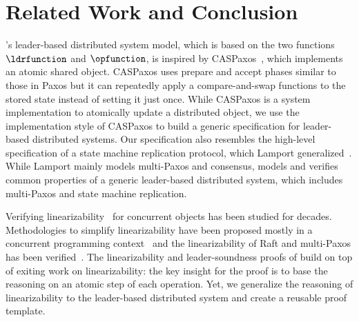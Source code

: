 \vspace{-0.7em}

\section{Related Work and Conclusion}
\label{sec:related}

\sysname{}'s leader-based distributed system model, which is based on the two functions
$\ldrfunction$ and $\opfunction$, is inspired by CASPaxos~\cite{caspaxos},
which implements an atomic shared object. CASPaxos uses prepare and accept
phases similar to those in Paxos but it can repeatedly apply a compare-and-swap
functions to the stored state instead of setting it just once. While CASPaxos is a system implementation
to atomically update a distributed object, we use the implementation style of
CASPaxos to build a generic specification for leader-based distributed systems.
Our specification also resembles the high-level specification of a state machine
replication protocol, which Lamport generalized~\cite{generalizedconsensus}.
While Lamport mainly models multi-Paxos and consensus, \sysname{} models and
verifies common properties of a generic leader-based distributed system,
which includes multi-Paxos and state machine replication.
%
\vspace{-0.2em}

Verifying linearizability~\cite{herlihy90} for concurrent objects has been
studied for decades. Methodologies to simplify linearizability have been
proposed mostly in a concurrent programming context~\cite{Elmas10tacas,
Liang13pldi,Gotsman12concur,Viktor10CAV} and the linearizability of Raft and
multi-Paxos has been verified~\cite{cppraft, ironfleet}. The linearizability
and leader-soundness proofs of \sysname{} build on top of exiting work on
linearizability: the key insight for the proof is to base the reasoning on
an atomic step of each operation.  Yet, we generalize the reasoning of linearizability
to the leader-based distributed system and create a reusable proof template.

